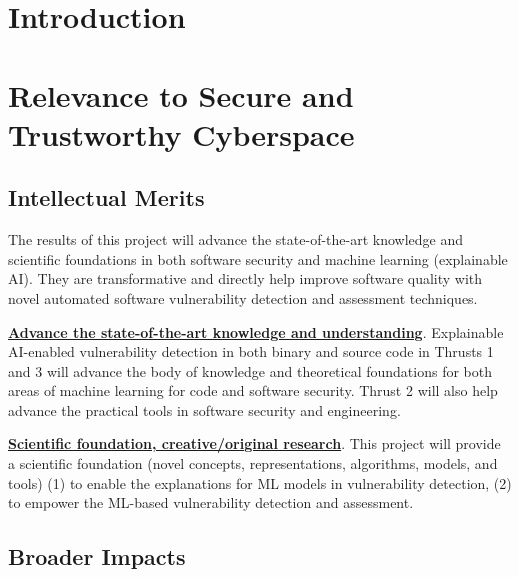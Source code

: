 \section{Introduction}\label{sec:intro}



%





\section{Relevance to Secure and Trustworthy Cyberspace}

\subsection{Intellectual Merits}

The results of this project will advance the state-of-the-art
knowledge and scientific foundations in both software security and
machine learning (explainable AI). They are transformative and
directly help improve software quality with novel automated software
vulnerability detection and assessment techniques.

\noindent \underline{{\bf Advance the state-of-the-art knowledge and
    understanding}}. Explainable AI-enabled vulnerability detection in
both binary and source code in Thrusts 1 and 3 will advance the body
of knowledge and theoretical foundations for both areas of machine
learning for code and software security. Thrust 2 will also help
advance the practical tools in software security and engineering.

\noindent \underline{{\bf Scientific foundation, creative/original
    research}}. This project will provide a scientific foundation
(novel concepts, representations, algorithms, models, and tools) (1)
to enable the explanations for ML models in vulnerability detection,
(2) to empower the ML-based vulnerability detection and assessment.


\subsection{Broader Impacts}

